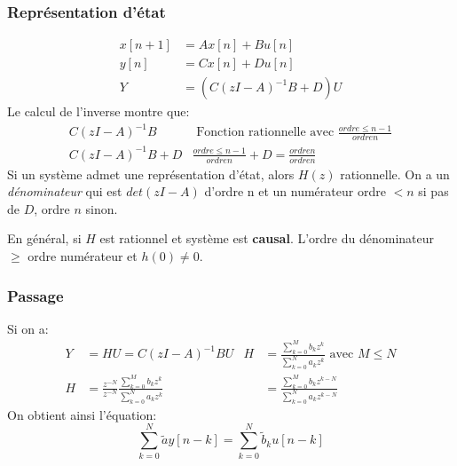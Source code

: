 \documentclass{report}
\begin{document}
\subsubsection{Représentation d'état}
\begin{align*}
x[n+1] &= Ax[n] + Bu[n]\\
y[n] &= Cx[n] + Du[n]\\
Y &= (C(zI - A)^{-1} B + D)U
\end{align*}
Le calcul de l'inverse montre que:
\begin{align*}
C(zI -A)^{-1} B & \text{ Fonction rationnelle avec } \frac{ordre \leqslant n-1}{ordre n}\\
C(zI -A)^{-1} B + D & \frac{ordre \leqslant n-1}{ordre n} + D = \frac{ordre n}{ordre n}
\end{align*}
Si un système admet une représentation d'état, alors $H(z)$ rationnelle. On a un \textit{dénominateur} qui est $det(zI - A)$ d'ordre n et un numérateur ordre $< n$ si pas de $D$, ordre $n$ sinon.\par
En général, si $H$ est rationnel et système est \textbf{causal}. L'ordre du dénominateur $\geqslant$ ordre numérateur et $h(0) \neq 0$.

\subsubsection{Passage}
Si on a:
\begin{align*}
Y &= HU = C(zI - A)^{-1} BU & H &= \frac{\sum_{k=0}^M b_k z^k}{\sum_{k=0}^{N} a_k z^k} \text{ avec } M \leqslant N\\
H &= \frac{z^{-N}}{z^{-N}}\frac{\sum_{k=0}^M b_k z^k}{\sum_{k=0}^{N} a_k z^k} & &= \frac{\sum_{k=0}^M b_k z^{k-N}}{\sum_{k=0}^{N} a_k z^{k-N}}
\end{align*}
On obtient ainsi l'équation:
\begin{equation}
\sum_{k=0}^N \tilde{a} y[n-k] = \sum_{k=0}^N \tilde{b}_k u[n-k]
\end{equation}
\end{document}
